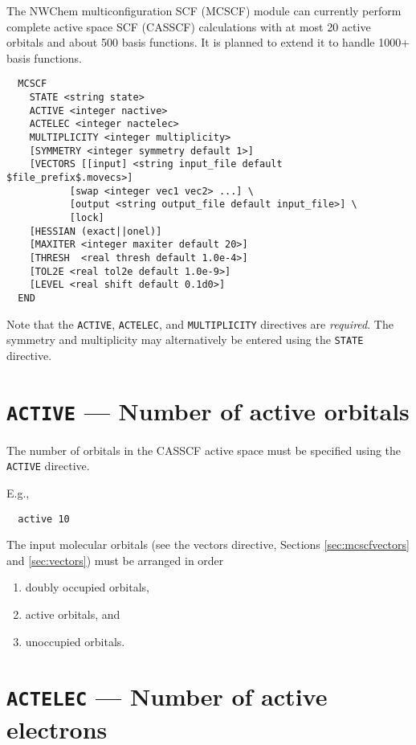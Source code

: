 %
%
\label{sec:mcscf}

The NWChem multiconfiguration SCF (MCSCF) module can currently perform
complete active space SCF (CASSCF) calculations with at most 20 active
orbitals and about 500 basis functions.  It is planned to extend it to 
handle 1000+ basis functions.

\begin{verbatim}
  MCSCF
    STATE <string state>
    ACTIVE <integer nactive>
    ACTELEC <integer nactelec>
    MULTIPLICITY <integer multiplicity>
    [SYMMETRY <integer symmetry default 1>]
    [VECTORS [[input] <string input_file default $file_prefix$.movecs>] 
           [swap <integer vec1 vec2> ...] \
           [output <string output_file default input_file>] \
           [lock]
    [HESSIAN (exact||onel)]
    [MAXITER <integer maxiter default 20>]
    [THRESH  <real thresh default 1.0e-4>]
    [TOL2E <real tol2e default 1.0e-9>]
    [LEVEL <real shift default 0.1d0>]
  END
\end{verbatim}
Note that the \verb+ACTIVE+, \verb+ACTELEC+, and \verb+MULTIPLICITY+
directives are {\em required}.  The symmetry and multiplicity may
alternatively be entered using the \verb+STATE+ directive.

\section{{\tt ACTIVE} --- Number of active orbitals}

The number of orbitals in the CASSCF active space must be specified
using the {\tt ACTIVE} directive.

E.g.,
\begin{verbatim}
  active 10
\end{verbatim}

The input molecular orbitals (see the vectors directive, Sections
\ref{sec:mcscfvectors} and \ref{sec:vectors}) must be arranged in
order
\begin{enumerate}
\item doubly occupied orbitals,
\item active orbitals, and
\item unoccupied orbitals.
\end{enumerate}

\section{{\tt ACTELEC} --- Number of active electrons}

